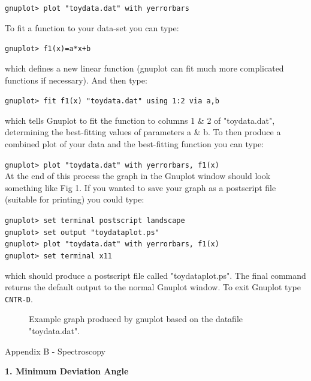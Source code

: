 \documentclass[12pt]{article}
\begin{document}
{\tt gnuplot> plot "toydata.dat" with yerrorbars}

To fit a function to your data-set you can type:

{\tt gnuplot> f1(x)=a*x+b}

which defines a new linear function (gnuplot can fit much more
complicated functions if necessary). And then type:

{\tt gnuplot> fit f1(x) "toydata.dat" using 1:2 via a,b}

which tells Gnuplot to fit the function to columns 1 \& 2 of
"toydata.dat", determining the best-fitting values of parameters a
\& b. To then produce a combined plot of your data and the best-fitting
function you can type:

{\tt gnuplot> plot "toydata.dat" with yerrorbars, f1(x)}\\
\newpage
At the end of this process the graph in the Gnuplot window should look
something like Fig 1. If you wanted to save your graph as a postscript
file (suitable for printing) you could type:

{\tt gnuplot> set terminal postscript landscape}\\
{\tt gnuplot> set output "toydataplot.ps"}\\
{\tt gnuplot> plot "toydata.dat" with yerrorbars, f1(x)}\\
{\tt gnuplot> set terminal x11}

which should produce a postscript file called "toydataplot.ps". The
final command returns the default output to the normal Gnuplot
window. To exit Gnuplot type {\tt CNTR-D}.

\begin{figure}
\centerline{}
\caption{Example graph produced 
by gnuplot based on the datafile "toydata.dat".}
\end{figure}


\newpage
\pagestyle{empty}

\centerline{\hspace{-2cm}  \Huge Appendix B - Spectroscopy}

\begin{center}
{\large {\bf 1. Minimum Deviation Angle}}
\end{center}
\centerline{}
\end{document}

